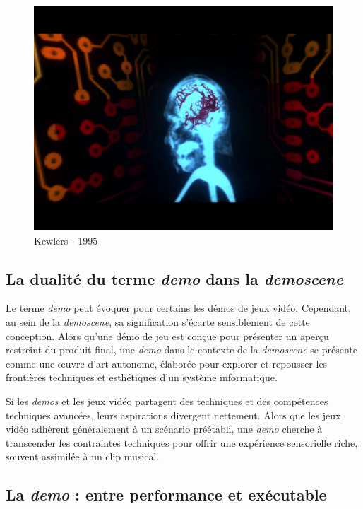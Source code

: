 \begin{figure}[h]
\begin{minipage}[b]{0.30\linewidth}
    \centering
    \includegraphics[width=\linewidth]{images/demoscene/demos/kewl3.png}
  \end{minipage}
  \caption{Kewlers - 1995}
  \label{kewl}
\end{figure}

\subsection*{La dualité du terme \textit{demo} dans la \textit{demoscene}}




Le terme \textit{demo} peut évoquer pour certains les démos de jeux vidéo. Cependant, au sein de la \textit{demoscene}, sa signification s'écarte sensiblement de cette conception. Alors qu'une démo de jeu est conçue pour présenter un aperçu restreint du produit final, une \textit{demo} dans le contexte de la \textit{demoscene} se présente comme une œuvre d'art autonome, élaborée pour explorer et repousser les frontières techniques et esthétiques d'un système informatique.






Si les \textit{demos} et les jeux vidéo partagent des techniques et des compétences techniques avancées, leurs aspirations divergent nettement. Alors que les jeux vidéo adhèrent généralement à un scénario préétabli, une \textit{demo} cherche à transcender les contraintes techniques pour offrir une expérience sensorielle riche, souvent assimilée à un clip musical.



\subsection*{La \textit{demo} : entre performance et exécutable}





